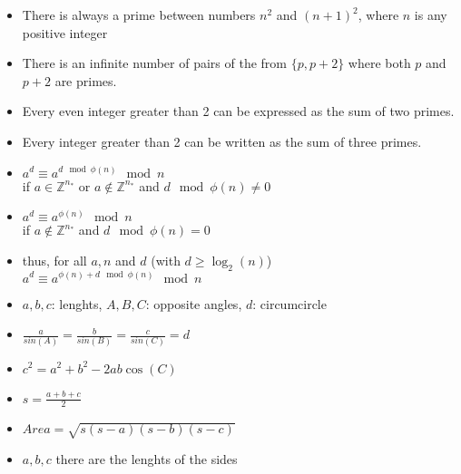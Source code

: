 \begin{itemize}
\item There is always a prime between numbers $n^2$ and $(n+1)^2$, where $n$ is any positive integer
\item There is an infinite number of pairs of the from $\{p, p + 2\}$ where both $p$ and $p + 2$ are primes.
\item Every even integer greater than 2 can be expressed as the sum of two primes.
\item Every integer greater than 2 can be written as the sum of three primes.
\end{itemize}

\begin{itemize}
\item $a^{d} \equiv a^{d \mod \phi(n)} \mod n$ \\
      if $a \in \mathbb{Z}^{n_{*}}$ or $a \notin \mathbb{Z}^{n_{*}}$ and $d \mod \phi(n) \neq 0$
\item $a^{d} \equiv a^{\phi(n)} \mod n$ \\
      if $a \notin \mathbb{Z}^{n_{*}}$ and $d \mod \phi(n) = 0$
\item thus, for all $a, n$ and $d$ (with $d \geq \log_2(n)$) \\
      $a^{d} \equiv a^{\phi(n) + d \mod \phi(n)} \mod n$
\end{itemize}


\begin{itemize}
\item $a, b, c$: lenghts, $A, B, C$: opposite angles, $d$: circumcircle
\item $\frac{a}{sin(A)} = \frac{b}{sin(B)} = \frac{c}{sin(C)} = d$
\item $c^2 = a^2 + b^2 - 2ab\cos(C)$
\end{itemize}

\begin{itemize}
\item $s = \frac{a+b+c}{2}$
\item $Area = \sqrt{s(s-a)(s-b)(s-c)}$
\item $a, b, c$ there are the lenghts of the sides
\end{itemize}

